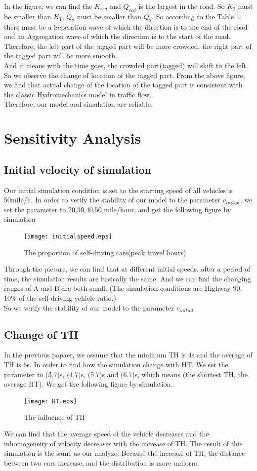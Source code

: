 \documentclass[UTF8]{mcmthesis}
\begin{document}
\indent In the figure, we can find the $K_{red}$ and $Q_{red}$ is the largest in the road. So $K_{2}$ must be smaller than $K_{1}$, $Q_{2}$ must be smaller than $Q_{1}$. So according to the Table 1, there must be a Seperation wave of which the direction is to the end of the road  and an Aggregation wave of which the direction is to the start of the road.\\
\indent Therefore, the left part of the tagged part will be more crowded, the right part of the tagged part will be more smooth.\\
\indent And it means with the time goes, the crowded part(tagged) will shift to the left. So we observe the change of location of the tagged part. From the above figure, we find that actual change of the location of the tagged part is consistent with the classic Hydromechanics model in traffic flow. \\
\indent Therefore, our model and simulation are reliable.


\section{Sensitivity Analysis}
\subsection{Initial velocity of simulation}
\indent Our initial simulation condition is set to the starting speed of all vehicles is 50mile/h. In order to verify the stability of our model to the parameter $v_{initial}$, we set the parameter to 20,30,40,50 mile/hour, and get the following figure by simulation
\begin{figure}[H]
	\centerline{\texttt{[image: initialspeed.eps]}}
	\caption{The proportion of self-driving cars(peak travel hours)}	
\end{figure}
\indent Through the picture, we can find that at different initial speeds, after a period of time, the simulation results are basically the same. And we can find the changing ranges of A and B are both small. (The simulation conditions are Highway 90, 10\% of the self-driving vehicle ratio.)\\
\indent So we verify the stability of our model to the parameter $v_{initial}$
\subsection{Change of TH}
\indent In the previous papaer, we assume that the minimum TH is 4s and the average of TH is 6s. In order to find how the simulation change with HT. We set the parameter to (3,7)s, (4,7)s, (5,7)s and (6,7)s, which means (the shortest TH, the average HT). We get the following figure by simulation.
\begin{figure}[H]
	\centerline{\texttt{[image: HT.eps]}}
	\caption{The influence of TH}	
\end{figure}
\indent We can find that the average speed of the vehicle decreases and the inhomogeneity of velocity decreases with the increase of TH. The result of this simulation is the same as our analyze. Because the increase of TH, the distance between two cars increase, and the distribution is more uniform.
\end{document}
